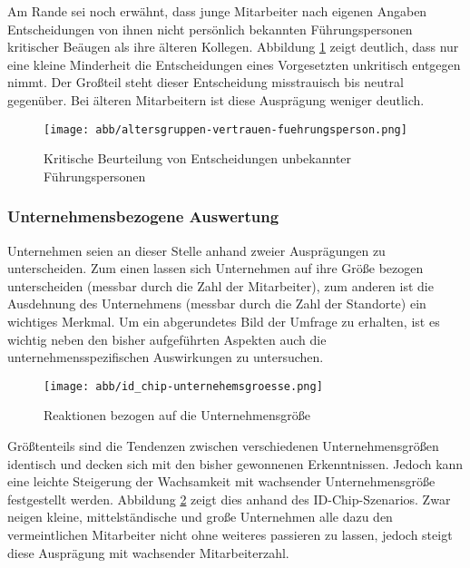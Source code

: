 Am Rande sei noch erwähnt, dass junge Mitarbeiter nach eigenen Angaben Entscheidungen von ihnen nicht persönlich bekannten Führungspersonen kritischer Beäugen als ihre älteren Kollegen.
Abbildung \ref{fig:kritische-beurteilung} zeigt deutlich, dass nur eine kleine Minderheit die Entscheidungen eines Vorgesetzten unkritisch entgegen nimmt.
Der Großteil steht dieser Entscheidung misstrauisch bis neutral gegenüber.
Bei älteren Mitarbeitern ist diese Ausprägung weniger deutlich.

\begin{figure}[htbp]
	\centering
	\texttt{[image: abb/altersgruppen-vertrauen-fuehrungsperson.png]}
	\caption{Kritische Beurteilung von Entscheidungen unbekannter Führungspersonen}
	\label{fig:kritische-beurteilung}
\end{figure}

\subsubsection{Unternehmensbezogene Auswertung}\label{sec:unternehmensbezogene-auswertung}

Unternehmen seien an dieser Stelle anhand zweier Ausprägungen zu unterscheiden.
Zum einen lassen sich Unternehmen auf ihre Größe bezogen unterscheiden (messbar durch die Zahl der Mitarbeiter), zum anderen ist die Ausdehnung des Unternehmens (messbar durch die Zahl der Standorte) ein wichtiges Merkmal.
Um ein abgerundetes Bild der Umfrage zu erhalten, ist es wichtig neben den bisher aufgeführten Aspekten auch die unternehmensspezifischen Auswirkungen zu untersuchen.

\begin{figure}[htbp]
	\centering
	\texttt{[image: abb/id\_chip-unternehemsgroesse.png]}
	\caption{Reaktionen bezogen auf die Unternehmensgröße}
	\label{fig:id-chip-unternehmensgroesse}
\end{figure}

Größtenteils sind die Tendenzen zwischen verschiedenen Unternehmensgrößen identisch und decken sich mit den bisher gewonnenen Erkenntnissen.
Jedoch kann eine leichte Steigerung der Wachsamkeit mit wachsender Unternehmensgröße festgestellt werden.
Abbildung \ref{fig:id-chip-unternehmensgroesse} zeigt dies anhand des ID-Chip-Szenarios.
Zwar neigen kleine, mittelständische und große Unternehmen alle dazu den vermeintlichen Mitarbeiter nicht ohne weiteres passieren zu lassen, jedoch steigt diese Ausprägung mit wachsender Mitarbeiterzahl.


